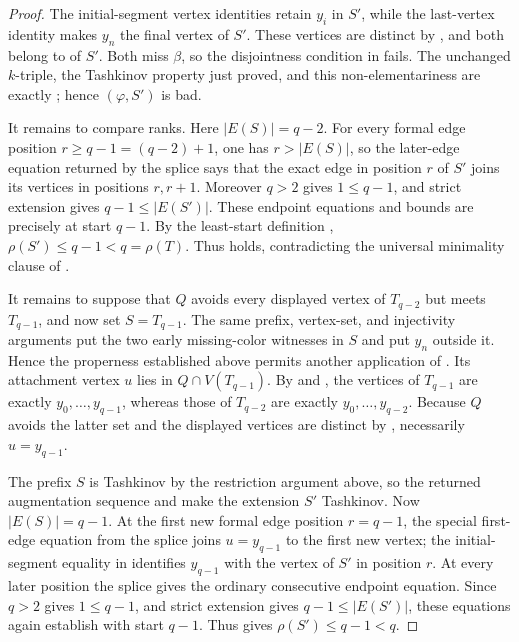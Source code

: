 \begin{proof}
The initial-segment vertex identities retain \(y_i\) in \(S'\), while
the last-vertex identity makes \(y_n\) the final vertex of \(S'\).
These vertices are distinct by , and both belong
to  of \(S'\).  Both miss \(\beta\), so
the disjointness condition in 
fails.  The unchanged \(k\)-triple, the Tashkinov property just proved,
and this non-elementariness are exactly
; hence \((\varphi,S')\) is bad.

It remains to compare ranks.  Here \(|E(S)|=q-2\).  For every formal
edge position \(r\ge q-1=(q-2)+1\), one has
\(r>|E(S)|\), so the later-edge equation returned by the splice says
that the exact edge in position \(r\) of \(S'\) joins its vertices in
positions \(r,r+1\).  Moreover \(q>2\) gives \(1\le q-1\), and strict
extension gives \(q-1\le |E(S')|\).  These endpoint equations and bounds
are precisely  at start \(q-1\).  By the
least-start definition ,
\(\rho(S')\le q-1<q=\rho(T)\).  Thus
 holds, contradicting the universal
minimality clause of .

It remains to suppose that \(Q\) avoids every displayed vertex of
\(T_{q-2}\) but meets \(T_{q-1}\), and now set \(S=T_{q-1}\).  The
same prefix, vertex-set, and injectivity arguments put the two early
missing-color witnesses in \(S\) and put \(y_n\) outside it.  Hence the
properness established above permits another application of
.  Its attachment vertex
\(u\) lies in \(Q\cap V(T_{q-1})\).  By
 and , the
vertices of \(T_{q-1}\) are exactly
\(y_0,\ldots,y_{q-1}\), whereas those of \(T_{q-2}\) are exactly
\(y_0,\ldots,y_{q-2}\).  Because \(Q\) avoids the latter set and the
displayed vertices are distinct by , necessarily
\(u=y_{q-1}\).

The prefix \(S\) is Tashkinov by the restriction argument above, so the
returned augmentation sequence and
 make the
extension \(S'\) Tashkinov.  Now \(|E(S)|=q-1\).  At the first new
formal edge position \(r=q-1\), the special first-edge equation from
the splice joins \(u=y_{q-1}\) to the first new vertex; the
initial-segment equality in 
identifies \(y_{q-1}\) with the vertex of \(S'\) in position \(r\).
At every later position the splice gives the ordinary consecutive
endpoint equation.  Since \(q>2\) gives \(1\le q-1\), and strict
extension gives \(q-1\le |E(S')|\), these equations again establish
 with start \(q-1\).  Thus
 gives \(\rho(S')\le q-1<q\).


\end{proof}
